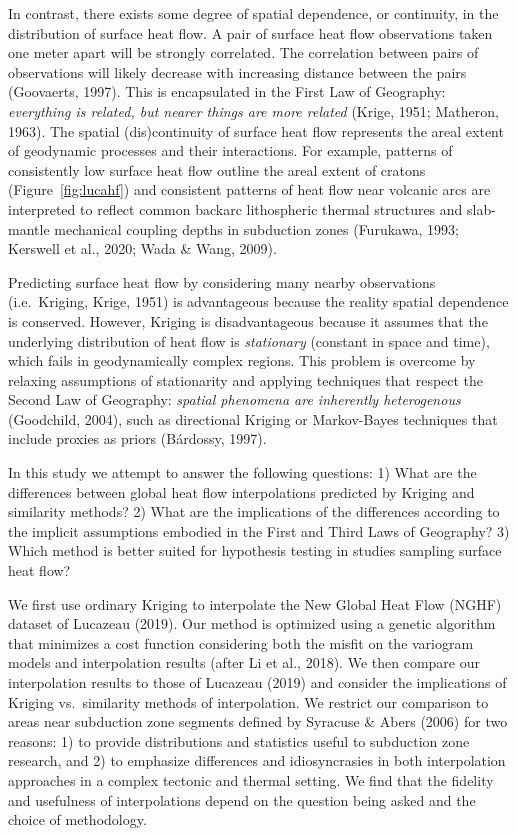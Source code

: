 \documentclass[draft,linenumbers]{agujournal2018}
\begin{document}
In contrast, there exists some degree of spatial dependence, or
continuity, in the distribution of surface heat flow. A pair of surface
heat flow observations taken one meter apart will be strongly
correlated. The correlation between pairs of observations will likely
decrease with increasing distance between the pairs (Goovaerts, 1997).
This is encapsulated in the First Law of Geography: \emph{everything is
related, but nearer things are more related} (Krige, 1951; Matheron,
1963). The spatial (dis)continuity of surface heat flow represents the
areal extent of geodynamic processes and their interactions. For
example, patterns of consistently low surface heat flow outline the
areal extent of cratons (Figure~\ref{fig:lucahf}) and consistent
patterns of heat flow near volcanic arcs are interpreted to reflect
common backarc lithospheric thermal structures and slab-mantle
mechanical coupling depths in subduction zones (Furukawa, 1993; Kerswell
et al., 2020; Wada \& Wang, 2009).

Predicting surface heat flow by considering many nearby observations
(i.e.~Kriging, Krige, 1951) is advantageous because the reality spatial
dependence is conserved. However, Kriging is disadvantageous because it
assumes that the underlying distribution of heat flow is
\emph{stationary} (constant in space and time), which fails in
geodynamically complex regions. This problem is overcome by relaxing
assumptions of stationarity and applying techniques that respect the
Second Law of Geography: \emph{spatial phenomena are inherently
heterogenous} (Goodchild, 2004), such as directional Kriging or
Markov-Bayes techniques that include proxies as priors (Bárdossy, 1997).

In this study we attempt to answer the following questions: 1) What are
the differences between global heat flow interpolations predicted by
Kriging and similarity methods? 2) What are the implications of the
differences according to the implicit assumptions embodied in the First
and Third Laws of Geography? 3) Which method is better suited for
hypothesis testing in studies sampling surface heat flow?

We first use ordinary Kriging to interpolate the New Global Heat Flow
(NGHF) dataset of Lucazeau (2019). Our method is optimized using a
genetic algorithm that minimizes a cost function considering both the
misfit on the variogram models and interpolation results (after Li et
al., 2018). We then compare our interpolation results to those of
Lucazeau (2019) and consider the implications of Kriging vs.~similarity
methods of interpolation. We restrict our comparison to areas near
subduction zone segments defined by Syracuse \& Abers (2006) for two
reasons: 1) to provide distributions and statistics useful to subduction
zone research, and 2) to emphasize differences and idiosyncrasies in
both interpolation approaches in a complex tectonic and thermal setting.
We find that the fidelity and usefulness of interpolations depend on the
question being asked and the choice of methodology.
\end{document}
